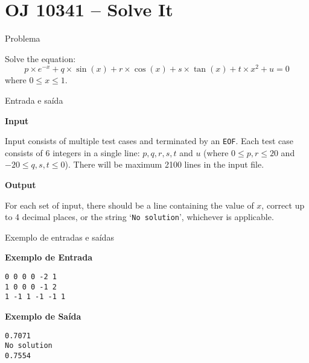 \section{OJ 10341 -- Solve It}

\begin{frame}[fragile]{Problema}

Solve the equation:
\[
    p\times e^{-x} + q\times \sin(x) + r\times \cos(x) + s\times \tan(x) + t\times x^2 + u = 0
\]
where $0\leq x\leq 1$.

\end{frame}

\begin{frame}[fragile]{Entrada e saída}

\textbf{Input}

Input consists of multiple test cases and terminated by an \texttt{EOF}. Each test case consists 
of 6 integers in a single line: $p, q, r, s, t$ and $u$ (where $0\leq p, r\leq 20$ and $-20\leq q, s, t\leq 0$). There will be maximum 2100 lines in the input file.

\vspace{0.1in}

\textbf{Output}

For each set of input, there should be a line containing the value of $x$, correct up to 4 
decimal places, or the string `\texttt{No solution}', whichever is applicable.

\end{frame}

\begin{frame}[fragile]{Exemplo de entradas e saídas}

\begin{minipage}[t]{0.5\textwidth}
\textbf{Exemplo de Entrada}
\begin{verbatim}
0 0 0 0 -2 1
1 0 0 0 -1 2
1 -1 1 -1 -1 1
\end{verbatim}
\end{minipage}
\begin{minipage}[t]{0.45\textwidth}
\textbf{Exemplo de Saída}
\begin{verbatim}
0.7071
No solution
0.7554
\end{verbatim}
\end{minipage}
\end{frame}


